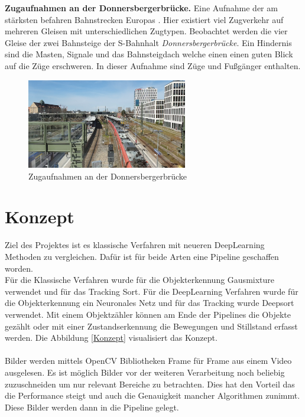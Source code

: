 \documentclass[conference]{IEEEtran}
\begin{document}
	\textbf{Zugaufnahmen an der Donnersbergerbrücke.} Eine Aufnahme der am stärksten befahren Bahnstrecken Europas \cite{z1}. Hier existiert viel Zugverkehr auf mehreren Gleisen mit unterschiedlichen Zugtypen. Beobachtet werden die vier Gleise der zwei Bahnsteige der S-Bahnhalt \textit{Donnersbergerbrücke}. Ein Hindernis sind die Masten, Signale und das Bahnsteigdach welche einen einen guten Blick auf die Züge erschweren. In dieser Aufnahme sind Züge und Fußgänger enthalten.
	\begin{figure}[!h]
		\begin{center}
			\includegraphics[width=7cm]{Media/DonnersbergerRaw.png}
			\caption{Zugaufnahmen an der Donnersbergerbrücke}
			\label{BrudermuhlRaw}
		\end{center}
	\end{figure}


	\section{Konzept}
	Ziel des Projektes ist es klassische Verfahren mit neueren DeepLearning Methoden zu vergleichen.
	Dafür ist für beide Arten eine Pipeline geschaffen worden.\\
	Für die Klassische Verfahren wurde für die Objekterkennung Gausmixture verwendet und für das Tracking Sort. Für die DeepLearning Verfahren wurde für die Objekterkennung ein Neuronales Netz  und für das Tracking wurde Deepsort verwendet. Mit einem Objektzähler können am Ende der Pipelines die Objekte gezählt oder mit einer Zustandserkennung die Bewegungen und Stillstand erfasst werden. Die Abbildung \ref{Konzept} visualisiert das Konzept.\\
	\\
	Bilder werden mittels OpenCV Bibliotheken Frame für Frame aus einem Video ausgelesen.
	Es ist möglich Bilder vor der weiteren Verarbeitung noch beliebig zuzuschneiden um nur relevant Bereiche zu betrachten. Dies hat den Vorteil das die Performance steigt und auch die Genauigkeit mancher Algorithmen zunimmt. Diese Bilder werden dann in die Pipeline gelegt.
	
\end{document}
